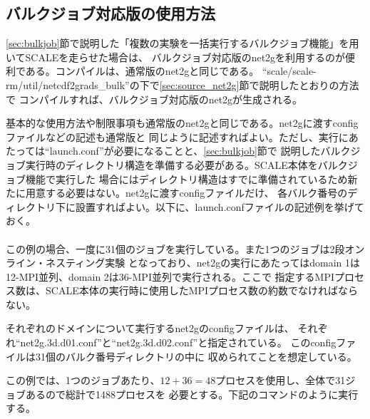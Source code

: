 \subsection{バルクジョブ対応版の使用方法}

\ref{sec:bulkjob}節で説明した「複数の実験を一括実行するバルクジョブ機能」を用いてSCALEを走らせた場合は、
バルクジョブ対応版のnet2gを利用するのが便利である。コンパイルは、通常版のnet2gと同じである。
``scale/scale-rm/util/netcdf2grads\_bulk''の下で\ref{sec:source_net2g}節で説明したとおりの方法で
コンパイルすれば、バルクジョブ対応版のnet2gが生成される。

基本的な使用方法や制限事項も通常版のnet2gと同じである。net2gに渡すconfigファイルなどの記述も通常版と
同じように記述すればよい。ただし、実行にあたっては``launch.conf''が必要になることと、\ref{sec:bulkjob}節で
説明したバルクジョブ実行時のディレクトリ構造を準備する必要がある。SCALE本体をバルクジョブ機能で実行した
場合にはディレクトリ構造はすでに準備されているため新たに用意する必要はない。net2gに渡すconfigファイルだけ、
各バルク番号のディレクトリ下に設置すればよい。以下に、launch.confファイルの記述例を挙げておく。\\

\\

\noindent この例の場合、一度に31個のジョブを実行している。また1つのジョブは2段オンライン・ネスティング実験
となっており、net2gの実行にあたってはdomain 1は12-MPI並列、domain 2は36-MPI並列で実行される。ここで
指定するMPIプロセス数は、SCALE本体の実行時に使用したMPIプロセス数の約数でなければならない。

それぞれのドメインについて実行するnet2gのconfigファイルは、
それぞれ``net2g.3d.d01.conf''と``net2g.3d.d02.conf''と指定されている。
このconfigファイルは31個のバルク番号ディレクトリの中に
収められてことを想定している。

この例では、1つのジョブあたり、$12 + 36 = 48$プロセスを使用し、全体で31ジョブあるので総計で1488プロセスを
必要とする。下記のコマンドのように実行する。

